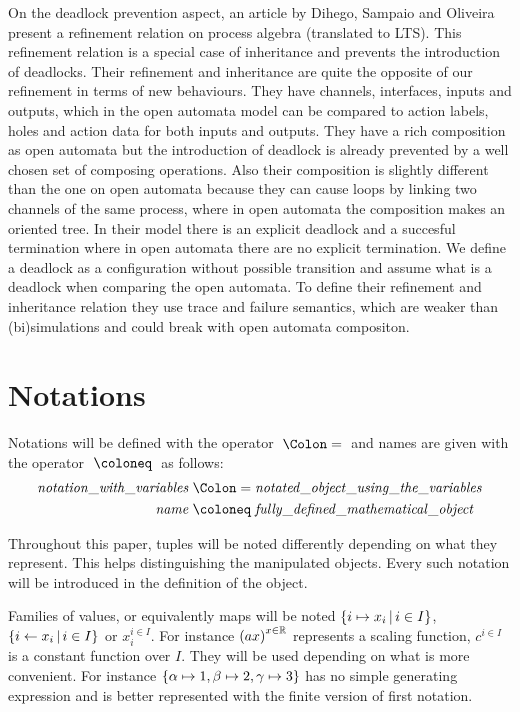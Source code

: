\documentclass{article}
\begin{document}
On the deadlock prevention aspect, an article by Dihego, Sampaio and Oliveira \cite{DIHEGO2020110598} present a refinement relation on process algebra (translated to LTS).
This refinement relation is a special case of inheritance and prevents the introduction of deadlocks.
Their refinement and inheritance are quite the opposite of our refinement in terms of new behaviours.
They have channels, interfaces, inputs and outputs, which in the open automata model can be compared to action labels, holes and action data for both inputs and outputs.
They have a rich composition as open automata but the introduction of deadlock is already prevented by a well chosen set of composing operations.
Also their composition is slightly different than the one on open automata because they can cause loops by linking two channels of the same process, where in open automata the composition makes an oriented tree.
In their model there is an explicit deadlock and a succesful termination where in open automata there are no explicit termination.
We define a deadlock as a configuration without possible transition and assume what is a deadlock when comparing the open automata.
To define their refinement and inheritance relation they use trace and failure semantics, which are weaker than (bi)simulations \cite{10.5555/640428.640430} and could break with open automata compositon.


\section{Notations}\label{sec:notations}
Notations will be defined with the operator \(\defnotation\) and names are given with the operator \(\defobject\) as follows:
\begin{align*}
	\mathit{notation\_with\_variables} & \defnotation \mathit{notated\_object\_using\_the\_variables} \\
	\mathit{name} & \defobject \mathit{fully\_defined\_mathematical\_object}
\end{align*}

Throughout this paper, tuples will be noted differently depending on what they represent.
This helps distinguishing the manipulated objects.
Every such notation will be introduced in the definition of the object.

Families of values, or equivalently maps will be noted \({\left\{i \mapsto x_i\,\middle|\, i \in I\right\}}\), \({\left\{i \gets x_i\,\middle|\, i \in I\right\}}\) or \(x_i^{i \in I}\).
For instance \({\left(ax\right)}^{x \in \mathbb{R}}\) represents a scaling function, \(c^{i \in I}\) is a constant function over \(I\).
They will be used depending on what is more convenient.
For instance \({\left\{\alpha \mapsto 1, \beta \mapsto 2, \gamma \mapsto 3\right\}}\) has no simple generating expression and is better represented with the finite version of first notation.
\end{document}
